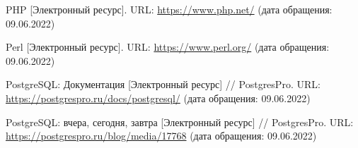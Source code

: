 \begin{thebibliography}{1}
	PHP [Электронный ресурс].
	URL: \url{https://www.php.net/}
	(дата обращения: 09.06.2022)
	
	Perl [Электронный ресурс].
	URL: \url{https://www.perl.org/}
	(дата обращения: 09.06.2022)
	
	PostgreSQL: Документация [Электронный ресурс] // PostgresPro.
	URL: \url{https://postgrespro.ru/docs/postgresql/}
	(дата обращения: 09.06.2022)
	
	PostgreSQL: вчера, сегодня, завтра [Электронный ресурс] // PostgresPro.
	URL: \url{https://postgrespro.ru/blog/media/17768}
	(дата обращения: 09.06.2022)
	
\end{thebibliography}


%
%
%	
%
%	
%	
%	
%	
%	
%	
%	
%	
%	
%
%
